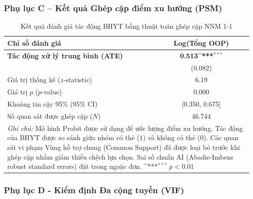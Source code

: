 \documentclass[12pt,a4paper]{article}
\begin{document}
\newpage
\subsubsection{Phụ lục C – Kết quả Ghép cặp điểm xu hướng (PSM)}

\begin{table}[htbp]
	\centering
	\def\sym#1{\ifmmode^{#1}\else\(^{#1}\)\fi}
	\caption{Kết quả đánh giá tác động BHYT bằng thuật toán ghép cặp NNM 1-1}
	\label{tab:psm_appendix}
	\begin{tabular}{lc}
		\toprule
		\textbf{Chỉ số đánh giá} & \textbf{Log(Tổng OOP)} \\
		\midrule
		\textbf{Tác động xử lý trung bình (ATE)} & \textbf{0.513\sym{***}} \\
		& (0.082) \\
		\addlinespace
		Giá trị thống kê ($z$-statistic) & 6.19 \\
		Giá trị $p$ ($p$-value) & 0.000 \\
		Khoảng tin cậy 95\% (95\% CI) & [0.350, 0.675] \\
		\midrule
		Số quan sát được ghép cặp ($N$) & 46.744 \\
		\bottomrule
		\multicolumn{2}{p{11.5cm}}{\footnotesize \textit{Ghi chú:} Mô hình Probit được sử dụng để ước lượng điểm xu hướng. Tác động của BHYT được so sánh giữa nhóm có thẻ ($1$) và không có thẻ ($0$). Các quan sát vi phạm Vùng hỗ trợ chung (Common Support) đã được loại bỏ trước khi ghép cặp nhằm giảm thiểu chệch lựa chọn. Sai số chuẩn AI (Abadie-Imbens robust standard errors) đặt trong ngoặc đơn. \newline \sym{***} \(p<0.01\)} \\
	\end{tabular}
\end{table}

\newpage
\subsubsection{Phụ lục D - Kiểm định Đa cộng tuyến (VIF)}
\end{document}
